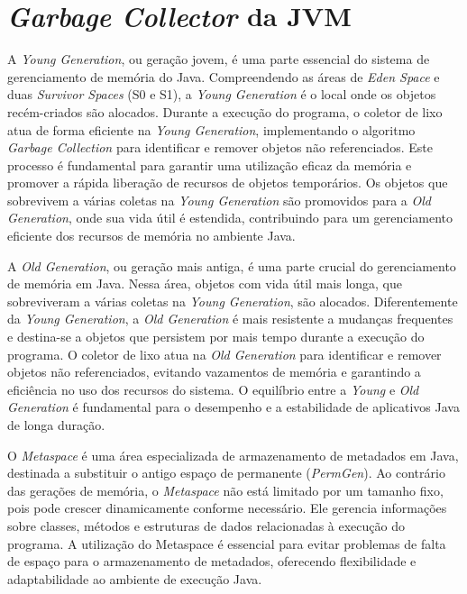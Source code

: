 \documentclass{article}
\begin{document}
    \section*{\emph{Garbage Collector} da JVM}

    A \emph{Young Generation}, ou geração jovem, é uma parte essencial do sistema de gerenciamento de memória do Java.
    Compreendendo as áreas de \emph{Eden Space} e duas \emph{Survivor Spaces} (S0 e S1), a \emph{Young Generation} é o local onde os objetos
    recém-criados são alocados. Durante a execução do programa, o coletor de lixo atua de forma eficiente na \emph{Young Generation},
    implementando o algoritmo \emph{Garbage Collection} para identificar e remover objetos não referenciados. Este processo é
    fundamental para garantir uma utilização eficaz da memória e promover a rápida liberação de recursos de objetos temporários.
    Os objetos que sobrevivem a várias coletas na \emph{Young Generation} são promovidos para a \emph{Old Generation}, onde sua vida útil é
    estendida, contribuindo para um gerenciamento eficiente dos recursos de memória no ambiente Java.

    A \emph{Old Generation}, ou geração mais antiga, é uma parte crucial do gerenciamento de memória em Java. Nessa área,
    objetos com vida útil mais longa, que sobreviveram a várias coletas na \emph{Young Generation}, são alocados.
    Diferentemente da \emph{Young Generation}, a \emph{Old Generation} é mais resistente a mudanças frequentes e destina-se a
    objetos que persistem por mais tempo durante a execução do programa. O coletor de lixo atua na \emph{Old Generation}
    para identificar e remover objetos não referenciados, evitando vazamentos de memória e garantindo a eficiência
    no uso dos recursos do sistema. O equilíbrio entre a \emph{Young} e \emph{Old Generation} é fundamental para o desempenho e a
    estabilidade de aplicativos Java de longa duração.

    O \emph{Metaspace} é uma área especializada de armazenamento de metadados em Java, destinada a substituir o
    antigo espaço de permanente (\emph{PermGen}). Ao contrário das gerações de memória, o \emph{Metaspace} não está limitado por
    um tamanho fixo, pois pode crescer dinamicamente conforme necessário. Ele gerencia informações sobre classes,
    métodos e estruturas de dados relacionadas à execução do programa. A utilização do Metaspace é essencial para
    evitar problemas de falta de espaço para o armazenamento de metadados, oferecendo flexibilidade e adaptabilidade
    ao ambiente de execução Java.
\end{document}
